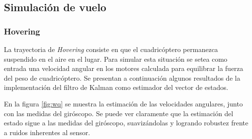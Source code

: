 \documentclass[main]{subfiles}
\begin{document}
\subsection{Simulación de vuelo}
\subsubsection{Hovering}
La trayectoria de \emph{Hovering} consiste en que el cuadricóptero permanezca suspendido en el aire en el lugar. Para simular esta situación se setea como entrada una velocidad angular en los motores calculada para equilibrar la fuerza del peso de cuadricóptero.
Se presentan a continuación algunos resultados de la implementación del filtro de Kalman como estimador del vector de estados.\\

\begin{figure} [h!]
\centering
   \hspace{10pt}
  \caption{}
  \label{fig:posyvel}
\end{figure}

En la figura \ref{fig:wq} se muestra la estimación de las velocidades angulares, junto con las medidas del giróscopo. Se puede ver claramente que la estimación del estado sigue a las medidas del giróscopo, suavizándolas y logrando robustez frente a ruidos inherentes al sensor.
\end{document}
